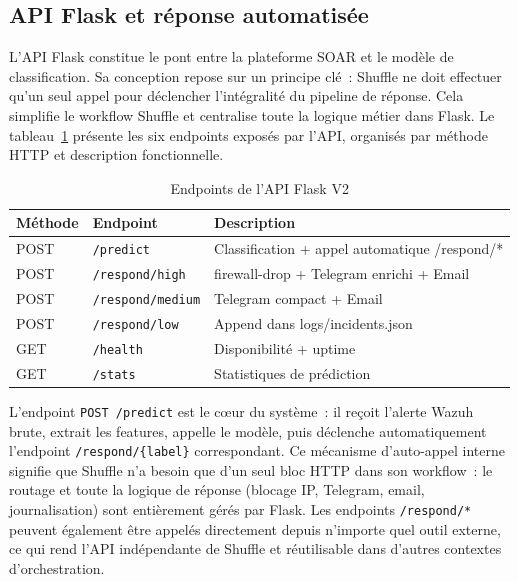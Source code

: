 \documentclass[12pt,a4paper]{report}
\begin{document}
\needspace{6cm}
\subsection{API Flask et réponse automatisée}

L'API Flask constitue le pont entre la plateforme SOAR et le modèle de classification. Sa conception repose sur un principe clé~: Shuffle ne doit effectuer qu'un seul appel pour déclencher l'intégralité du pipeline de réponse. Cela simplifie le workflow Shuffle et centralise toute la logique métier dans Flask. Le tableau~\ref{tab:endpoints} présente les six endpoints exposés par l'API, organisés par méthode HTTP et description fonctionnelle.

\begin{table}[H]
\centering
\caption{Endpoints de l'API Flask V2}
\label{tab:endpoints}
\begin{tabular}{|l|l|p{6cm}|}
\hline
\rowcolor{ColSection!15}
\textbf{Méthode} & \textbf{Endpoint} & \textbf{Description} \\
\hline
POST & \texttt{/predict}       & Classification + appel automatique /respond/* \\
POST & \texttt{/respond/high}  & firewall-drop + Telegram enrichi + Email \\
POST & \texttt{/respond/medium}& Telegram compact + Email \\
POST & \texttt{/respond/low}   & Append dans logs/incidents.json \\
GET  & \texttt{/health}        & Disponibilité + uptime \\
GET  & \texttt{/stats}         & Statistiques de prédiction \\
\hline
\end{tabular}
\end{table}

L'endpoint \texttt{POST /predict} est le cœur du système~: il reçoit l'alerte Wazuh brute, extrait les features, appelle le modèle, puis déclenche automatiquement l'endpoint \texttt{/respond/\{label\}} correspondant. Ce mécanisme d'auto-appel interne signifie que Shuffle n'a besoin que d'un seul bloc HTTP dans son workflow~: le routage et toute la logique de réponse (blocage IP, Telegram, email, journalisation) sont entièrement gérés par Flask. Les endpoints \texttt{/respond/*} peuvent également être appelés directement depuis n'importe quel outil externe, ce qui rend l'API indépendante de Shuffle et réutilisable dans d'autres contextes d'orchestration.

\needspace{6cm}
\end{document}
